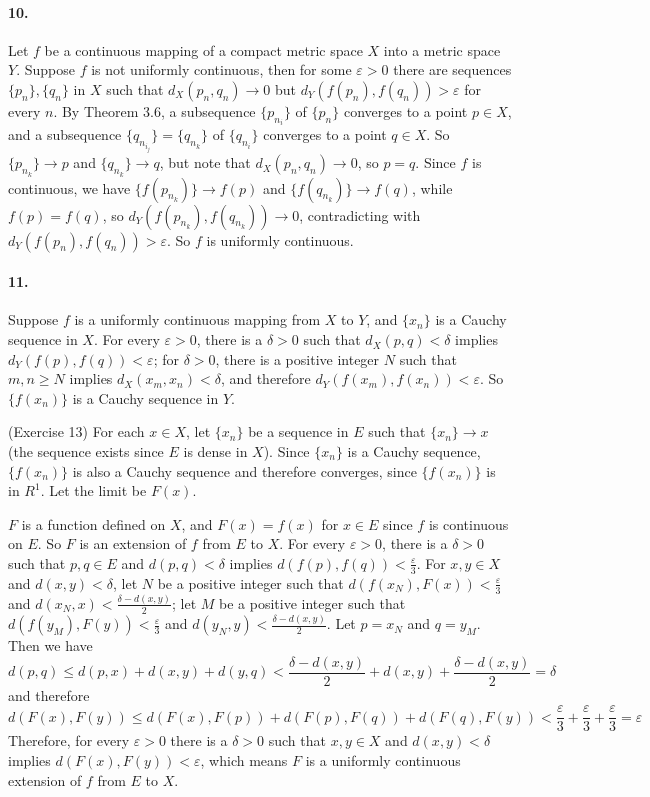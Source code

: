 \documentclass[a4paper]{article}
\begin{document}
\paragraph{10.}
Let $f$ be a continuous mapping of a compact metric space $X$ into a metric space $Y$. Suppose $f$ is not uniformly continuous, then for some $\varepsilon>0$ there are sequences $\{p_n\},\{q_n\}$ in $X$ such that $d_X(p_n,q_n)\to0$ but $d_Y(f(p_n),f(q_n))>\varepsilon$ for every $n$. By Theorem 3.6, a subsequence $\{p_{n_i}\}$ of $\{p_n\}$ converges to a point $p\in X$, and a subsequence $\{q_{n_{i_j}}\}=\{q_{n_k}\}$ of $\{q_{n_i}\}$ converges to a point $q\in X$. So $\{p_{n_k}\}\to p$ and $\{q_{n_k}\}\to q$, but note that $d_X(p_n,q_n)\to0$, so $p=  q$. Since $f$ is continuous, we have $\{f(p_{n_k})\}\to f(p)$ and $\{f(q_{n_k})\}\to f(q)$, while $f(p)=f(q)$, so $d_Y(f(p_{n_k}),f(q_{n_k}))\to0$, contradicting with $d_Y(f(p_n),f(q_n))>\varepsilon$. So $f$ is uniformly continuous. 

\paragraph{11.}
Suppose $f$ is a uniformly continuous mapping from $X$ to $Y$, and $\{x_n\}$ is a Cauchy sequence in $X$. For every $\varepsilon>0$, there is a $\delta>0$ such that $d_X(p,q)<\delta$ implies $d_Y(f(p),f(q))<\varepsilon$; for $\delta>0$, there is a positive integer $N$ such that $m,n\geq N$ implies $d_X(x_m,x_n)<\delta$, and therefore $d_Y(f(x_m),f(x_n))<\varepsilon$. So $\{f(x_n)\}$ is a Cauchy sequence in $Y$.
\smallskip

(Exercise 13) For each $x\in X$, let $\{x_n\}$ be a sequence in $E$ such that $\{x_n\}\to x$ (the sequence exists since $E$ is dense in $X$). Since $\{x_n\}$ is a Cauchy sequence, $\{f(x_n)\}$ is also a Cauchy sequence and therefore converges, since $\{f(x_n)\}$ is in $R^1$. Let the limit be $F(x)$.

$F$ is a function defined on $X$, and $F(x)=f(x)$ for $x\in E$ since $f$ is continuous on $E$. So $F$ is an extension of $f$ from $E$ to $X$. For every $\varepsilon>0$, there is a $\delta>0$ such that $p,q\in E$ and $d(p,q)<\delta$ implies $d(f(p),f(q))<\frac{\varepsilon}{3}$. For $x,y\in X$ and $d(x,y)<\delta$, let $N$ be a positive integer such that $d(f(x_N),F(x))<\frac{\varepsilon}{3}$ and $d(x_N,x)<\frac{\delta-d(x,y)}{2}$; let $M$ be a positive integer such that $d(f(y_M),F(y))<\frac{\varepsilon}{3}$ and $d(y_N,y)<\frac{\delta-d(x,y)}{2}$. Let $p=x_N$ and $q=y_M$. Then we have
\[
d(p,q)\leq d(p,x)+d(x,y)+d(y,q)<\frac{\delta-d(x,y)}{2}+d(x,y)+\frac{\delta-d(x,y)}{2}=\delta
\]
and therefore
\[
d(F(x),F(y))\leq d(F(x),F(p))+d(F(p),F(q))+d(F(q),F(y))<\frac{\varepsilon}{3}+\frac{\varepsilon}{3}+\frac{\varepsilon}{3}=\varepsilon
\]
Therefore, for every $\varepsilon>0$ there is a $\delta>0$ such that $x,y\in X$ and $d(x,y)<\delta$ implies $d(F(x),F(y))<\varepsilon$, which means $F$ is a uniformly continuous extension of $f$ from $E$ to $X$.
\end{document}
